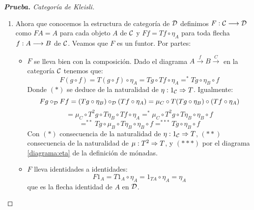\begin{proof}[\textbf{Prueba. } Categoría de Kleisli]
\begin{enumerate}
\begin{itemize}
    Esto muestra que en la categoría $\D$ la flecha $\eta_A$ es la
    identidad del objeto $A$ para cualquier objeto $A$ de la categoría.
    \end{itemize}
  \item Ahora que conocemos la estructura de categoría
    de $\D$ definimos $F : \mathcal{C}\longrightarrow \mathcal{D}$ como $FA = A$
    para cada objeto $A$ de $\mathcal{C}$ y $Ff = Tf \circ \eta_A$ para
    toda flecha $f: A\longrightarrow B$ de $\mathcal{C}$.
    Veamos que $F$ es un funtor. Por partes:
    \begin{itemize}
    \item $F$ se lleva bien con la composición. Dado el diagrama
      $A \xrightarrow{f} B \xrightarrow{C}$ en la categoría $\mathcal{C}$
      tenemos que:
      $$F(g \circ f) = T(g \circ f) \circ \eta_A
      = Tg \circ Tf \circ \eta_A
      =^* Tg \circ \eta_B \circ f$$
      Donde $(*)$ se deduce de la naturalidad de
      $\eta : 1_{\mathcal{C}}\Rightarrow T$. Igualmente:
      $$Fg \circ_{\mathcal{D}} Ff = (Tg \circ \eta_B) \circ_{\mathcal{D}} (Tf \circ \eta_A)
      = \mu_C \circ T(Tg \circ \eta_B) \circ (Tf \circ \eta_A)$$
      $$= \mu_C \circ T^2g \circ T\eta_B \circ Tf \circ \eta_A
      =^* \mu_C \circ T^2g \circ T\eta_B \circ \eta_B \circ f$$
      $$=^{**} Tg \circ \mu_B \circ T\eta_B \circ \eta_B \circ f
      =^{***} Tg \circ \eta_B \circ f$$
      Con $(*)$ consecuencia de la naturalidad de
      $\eta: 1_{\mathcal{C}}\Rightarrow T$, $(**)$ consecuencia de la naturalidad
      de $\mu : T^2\Rightarrow T$, y $(***)$ por el diagrama
      \eqref{diagrama:eta} de la definición de mónadas.


    \item $F$ lleva identidades a identidades:
      $$F1_A = T1_A \circ \eta_A = 1_{TA} \circ \eta_A = \eta_A$$
      que es la flecha identidad de $A$ en $\D$.

    \end{itemize}


\end{enumerate}
\end{proof}

